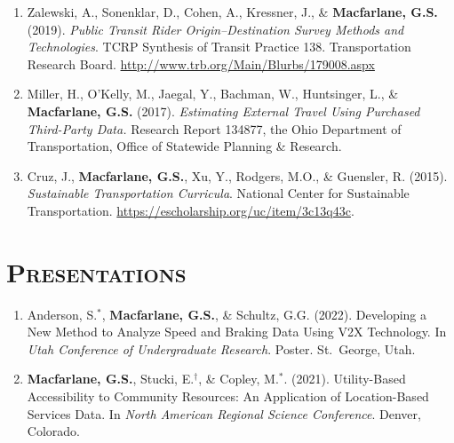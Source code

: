 \documentclass[margin,line]{res}
\newif\ifdetail
\newcounter{enuminitialize}
\newenvironment{myenum}[1][]
{%
 \setcounter{enuminitialize}{#1}
 \addtocounter{enuminitialize}{2}
 \begin{enumerate}[left= 4pt, itemsep=12pt, start=\value{enuminitialize}, label=\arabic*\addtocounter{enumi}{-2}]
}
{%
 \end{enumerate}
}
\newcommand{\secfont}{\scshape }
\begin{document}
\begin{resume}
\begin{myenum}[6]
\item Zalewski, A., Sonenklar, D., Cohen, A., Kressner, J., \& \textbf{Macfarlane, G.S.} (2019). \textit{ Public Transit Rider Origin–Destination Survey Methods and Technologies}. TCRP Synthesis of Transit Practice 138. Transportation Research Board. \url{http://www.trb.org/Main/Blurbs/179008.aspx} \ifdetail Citations: 1  \fi

\item Miller, H., O'Kelly, M., Jaegal, Y., Bachman, W., Huntsinger, L., \& \textbf{Macfarlane, G.S.} (2017). \textit{Estimating External Travel Using Purchased Third-Party Data.} Research Report 134877, the Ohio Department of Transportation, Office of Statewide Planning \& Research. \ifdetail Citations: 1  \fi

\item Cruz, J., \textbf{Macfarlane, G.S.}, Xu, Y., Rodgers, M.O., \& Guensler, R. (2015). \textit{Sustainable Transportation Curricula}. National Center for Sustainable Transportation. \url{https://escholarship.org/uc/item/3c13q43c}.
\end{myenum}

\noindent\makebox[\linewidth]{\rule{\linewidth}{0.4pt}}
\section{\secfont Presentations}
\ifdetail This includes invited presentations to academic and non-academic audiences, as
well as presentations resulting from abstract-only submission. Includes both
lectern sessions and posters. Item 1 came from my undergraduate honors thesis, items 2 through 4 from doctoral research,
items 5 through 10 from my work as a consultant, and items 11 through 17 respresent work
completed during my time at BYU.\fi
\vspace{0.3cm}
\begin{myenum}[17]
\item Anderson, S.$^*$, \textbf{Macfarlane, G.S.}, \& Schultz, G.G. (2022). Developing a New Method to Analyze Speed and Braking Data Using V2X Technology. In \textit{Utah Conference of Undergraduate Research}. Poster. St.\ George, Utah.


\item \textbf{Macfarlane, G.S.}, Stucki,  E.$^\dagger$,  \& Copley, M.$^*$. (2021). Utility-Based Accessibility to Community Resources: An Application of Location-Based Services Data. In \textit{North American Regional Science Conference}. Denver, Colorado.



\end{myenum}
\end{resume}
\end{document}
